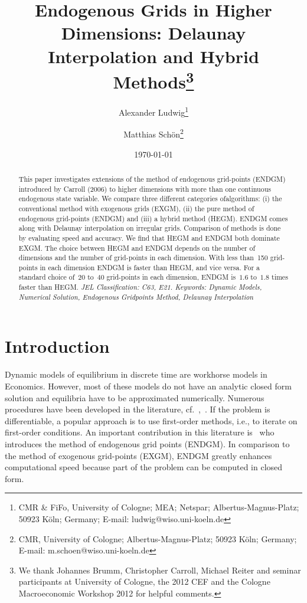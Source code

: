 \documentclass[a4paper,12pt]{article}%
\begin{document}
\title{Endogenous Grids in Higher Dimensions: Delaunay Interpolation and Hybrid Methods\thanks{We thank Johannes Brumm, Christopher Carroll, Michael Reiter and seminar participants at University of Cologne, the 2012 CEF and the Cologne Macroeconomic Workshop 2012 for helpful comments.}}
\author{Alexander Ludwig\thanks{CMR \& FiFo, University of Cologne; MEA; Netspar; Albertus-Magnus-Platz; 50923 K\"oln; Germany; E-mail: ludwig@wiso.uni-koeln.de}
\and Matthias Sch\"{o}n\thanks{CMR, University of Cologne; Albertus-Magnus-Platz; 50923 K\"{o}ln; Germany; E-mail: m.schoen@wiso.uni-koeln.de}}
\date{\today }
\maketitle

\begin{abstract}
This paper investigates extensions of the method of endogenous grid-points (ENDGM) introduced by Carroll (2006) to higher dimensions with more than one continuous endogenous state variable. We compare three different categories ofalgorithms: (i) the conventional method with exogenous grids (EXGM), (ii) the pure method of endogenous grid-points (ENDGM) and (iii) a hybrid method (HEGM). ENDGM comes along with Delaunay interpolation on irregular grids. Comparison of methods is done by evaluating speed and accuracy. We find that HEGM and ENDGM both dominate EXGM. The choice between HEGM and ENDGM depends on the number of dimensions and the number of grid-points in each dimension. With less than~150 grid-points in each dimension ENDGM is faster than HEGM, and vice versa. For a standard choice of~$20$ to~$40$ grid-points in each dimension, ENDGM is~$1.6$ to~$1.8$ times faster than HEGM. 
\newline\textit{JEL Classification: C63, E21.
\newline Keywords: Dynamic Models, Numerical Solution, Endogenous Gridpoints Method, Delaunay Interpolation}

\end{abstract}

\newpage{} \renewcommand{\thefootnote}{\arabic{footnote}} \setcounter{footnote}{0}

\section{Introduction}

Dynamic models of equilibrium in discrete time are workhorse models in Economics. However, most of these models do not have an analytic closed form solution and equilibria have to be approximated numerically. Numerous procedures have been developed in the literature, cf.~,~. If the problem is differentiable, a popular approach is to use first-order methods, i.e., to iterate on first-order conditions. An important contribution in this literature is~ who introduces the method of endogenous grid points (ENDGM). In comparison to the method of exogenous grid-points (EXGM), ENDGM greatly enhances computational speed because part of the problem can be computed in closed form.
\end{document}
